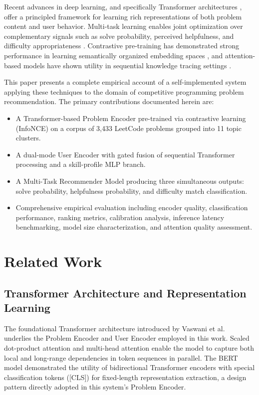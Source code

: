 \documentclass[12pt]{article}
\begin{document}
Recent advances in deep learning, and specifically Transformer architectures \cite{vaswani2017attention}, offer a principled framework for learning rich representations of both problem content and user behavior. Multi-task learning enables joint optimization over complementary signals such as solve probability, perceived helpfulness, and difficulty appropriateness \cite{kendall2018multitask}. Contrastive pre-training has demonstrated strong performance in learning semantically organized embedding spaces \cite{chen2020simclr}, and attention-based models have shown utility in sequential knowledge tracing settings \cite{pandey2019sakt,ghosh2020akt}.

This paper presents a complete empirical account of a self-implemented system applying these techniques to the domain of competitive programming problem recommendation. The primary contributions documented herein are:

\begin{itemize}
    \item A Transformer-based Problem Encoder pre-trained via contrastive learning (InfoNCE) on a corpus of 3,433 LeetCode problems grouped into 11 topic clusters.
    \item A dual-mode User Encoder with gated fusion of sequential Transformer processing and a skill-profile MLP branch.
    \item A Multi-Task Recommender Model producing three simultaneous outputs: solve probability, helpfulness probability, and difficulty match classification.
    \item Comprehensive empirical evaluation including encoder quality, classification performance, ranking metrics, calibration analysis, inference latency benchmarking, model size characterization, and attention quality assessment.
\end{itemize}

\section{Related Work}

\subsection{Transformer Architecture and Representation Learning}

The foundational Transformer architecture introduced by Vaswani et al.\ \cite{vaswani2017attention} underlies the Problem Encoder and User Encoder employed in this work. Scaled dot-product attention and multi-head attention enable the model to capture both local and long-range dependencies in token sequences in parallel. The BERT model \cite{devlin2019bert} demonstrated the utility of bidirectional Transformer encoders with special classification tokens ([CLS]) for fixed-length representation extraction, a design pattern directly adopted in this system's Problem Encoder.
\end{document}
